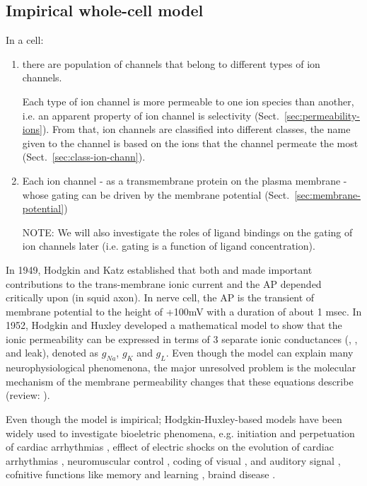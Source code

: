 \subsection{Impirical whole-cell model}

In a cell:
\begin{enumerate}
   \item there are population of channels that belong to different types of ion
   channels.

   Each type of ion channel is more permeable to one ion species than another,
   i.e.   an apparent property of ion channel is selectivity
  (Sect.~\ref{sec:permeability-ions}). From that, ion channels are classified
  into different classes, the name given to the channel is based on the ions
  that the channel permeate the most (Sect.~\ref{sec:class-ion-chann}).

 \item Each ion channel - as a transmembrane protein on the plasma
 membrane - whose gating can be driven by the membrane potential
 (Sect.~\ref{sec:membrane-potential})

 NOTE: We will also investigate the roles of ligand bindings on the gating
 of ion channels later (i.e. gating is a function of ligand concentration).

\end{enumerate}

In 1949, Hodgkin and Katz established that both  and  made
important contributions to the trans-membrane ionic current and the AP depended
critically upon  (in squid axon). In nerve cell, the AP is the transient
of membrane potential to the height of +100mV with a duration of about 1 msec.
In 1952, Hodgkin and Huxley developed a mathematical model to show that the ionic
permeability can be expressed in terms of 3 separate ionic conductances
(, , and leak), denoted as $g_{Na}$, $g_K$ and $g_L$. Even though
the model can explain many neurophysiological phenomenona, the major unresolved
problem  is the molecular mechanism of the membrane permeability changes that
these equations describe (review:
\citep{ehrenstein1970nnr,ehrenstein1972}).

Even though the model is impirical; Hodgkin-Huxley-based models have been widely
used to investigate bioeletric phenomena, e.g. initiation and perpetuation of
cardiac arrhythmias \citep{beaumont1998, samie2000, qu2000, qu1999, karma1994,
harrild2000, fenton1998, comtois1999}, efflect of electric shocks on the
evolution of cardiac arrhythmias \citep{benett1999,  vigmond2001,
krassowska2003, meunier2002}, neuromuscular control \citep{ekeberg1999}, coding
of visual \citep{greenberg1999,kamiyama1996, siegel2001}, and auditory signal
\citep{cartee2000}, cofnitive functions like memory and learning
\citep{lytton1998, luk2000, shorten2000, stemmler1999}, braind disease
\citep{kubata2002}.


